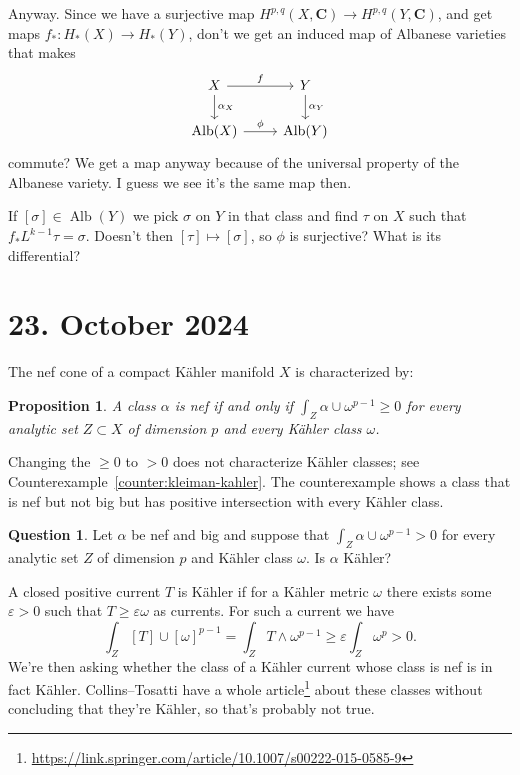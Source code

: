 \documentclass[11pt]{amsart}
\newtheorem{prop}[theo]{Proposition}
\theoremstyle{definition}
\newtheorem{ques}[theo]{Question}
\def\eps{\varepsilon}
\def\CC{\mathbf{C}}
\begin{document}
Anyway.
Since we have a surjective map $H^{p,q}(X,\CC) \to H^{p,q}(Y,\CC)$, and get maps $f_* : H_*(X) \to H_*(Y)$, don't we get an induced map of Albanese varieties that makes
\[
\begin{tikzcd}
X \ar[d,"\alpha_X"] \ar[r,"f"] &
Y \ar[d,"\alpha_Y"]
\\
\operatorname{Alb}(X) \ar[r,"\phi"] &
\operatorname{Alb}(Y)
\end{tikzcd}
\]
commute?
We get a map anyway because of the universal property of the Albanese variety.
I guess we see it's the same map then.

If $[\sigma] \in \operatorname{Alb}(Y)$ we pick $\sigma$ on $Y$ in that class and find $\tau$ on $X$ such that $f_*L^{k-1}\tau = \sigma$.
Doesn't then $[\tau] \mapsto [\sigma]$, so $\phi$ is surjective?
What is its differential?



\section{23. October 2024}

The nef cone of a compact K\"ahler manifold $X$ is characterized by:

\begin{prop}
A class $\alpha$ is nef if and only if $\int_Z \alpha \cup \omega^{p-1} \geq 0$ for every analytic set $Z \subset X$ of dimension $p$ and every K\"ahler class $\omega$.
\end{prop}

Changing the $\geq 0$ to $> 0$ does not characterize K\"ahler classes; see Counterexample~\ref{counter:kleiman-kahler}.
The counterexample shows a class that is nef but not big but has positive intersection with every K\"ahler class.


\begin{ques}
Let $\alpha$ be nef and big and suppose that $\int_Z \alpha \cup \omega^{p-1} > 0$ for every analytic set $Z$ of dimension $p$ and K\"ahler class $\omega$.
Is $\alpha$ K\"ahler?
\end{ques}

A closed positive current $T$ is K\"ahler if for a K\"ahler metric $\omega$ there exists some $\eps > 0$ such that $T \geq \eps \omega$ as currents.
For such a current we have
\[
\int_Z [T] \cup [\omega]^{p-1}
= \int_Z T \wedge \omega^{p-1}
\geq \eps \int_Z \omega^p > 0.
\]
We're then asking whether the class of a K\"ahler current whose class is nef is in fact K\"ahler.
Collins--Tosatti have a whole article\footnote{\url{https://link.springer.com/article/10.1007/s00222-015-0585-9}} about these classes without concluding that they're K\"ahler, so that's probably not true.
\end{document}
